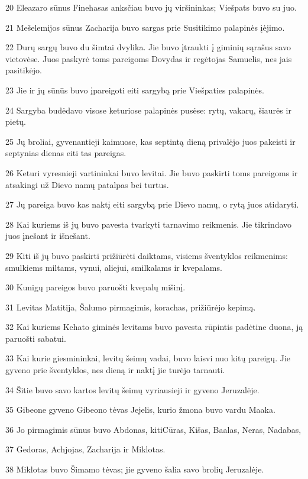 \par 20 Eleazaro sūnus Finehasas anksčiau buvo jų viršininkas; Viešpats buvo su juo. 
\par 21 Mešelemijos sūnus Zacharija buvo sargas prie Susitikimo palapinės įėjimo. 
\par 22 Durų sargų buvo du šimtai dvylika. Jie buvo įtraukti į giminių sąrašus savo vietovėse. Juos paskyrė toms pareigoms Dovydas ir regėtojas Samuelis, nes jais pasitikėjo. 
\par 23 Jie ir jų sūnūs buvo įpareigoti eiti sargybą prie Viešpaties palapinės. 
\par 24 Sargyba budėdavo visose keturiose palapinės pusėse: rytų, vakarų, šiaurės ir pietų. 
\par 25 Jų broliai, gyvenantieji kaimuose, kas septintą dieną privalėjo juos pakeisti ir septynias dienas eiti tas pareigas. 
\par 26 Keturi vyresnieji vartininkai buvo levitai. Jie buvo paskirti toms pareigoms ir atsakingi už Dievo namų patalpas bei turtus. 
\par 27 Jų pareiga buvo kas naktį eiti sargybą prie Dievo namų, o rytą juos atidaryti. 
\par 28 Kai kuriems iš jų buvo pavesta tvarkyti tarnavimo reikmenis. Jie tikrindavo juos įnešant ir išnešant. 
\par 29 Kiti iš jų buvo paskirti prižiūrėti daiktams, visiems šventyklos reikmenims: smulkiems miltams, vynui, aliejui, smilkalams ir kvepalams. 
\par 30 Kunigų pareigos buvo paruošti kvepalų mišinį. 
\par 31 Levitas Matitija, Šalumo pirmagimis, korachas, prižiūrėjo kepimą. 
\par 32 Kai kuriems Kehato giminės levitams buvo pavesta rūpintis padėtine duona, ją paruošti sabatui. 
\par 33 Kai kurie giesmininkai, levitų šeimų vadai, buvo laisvi nuo kitų pareigų. Jie gyveno prie šventyklos, nes dieną ir naktį jie turėjo tarnauti. 
\par 34 Šitie buvo savo kartos levitų šeimų vyriausieji ir gyveno Jeruzalėje. 
\par 35 Gibeone gyveno Gibeono tėvas Jejelis, kurio žmona buvo vardu Maaka. 
\par 36 Jo pirmagimis sūnus buvo Abdonas, kiti­Cūras, Kišas, Baalas, Neras, Nadabas, 
\par 37 Gedoras, Achjojas, Zacharija ir Miklotas. 
\par 38 Miklotas buvo Šimamo tėvas; jie gyveno šalia savo brolių Jeruzalėje. 
